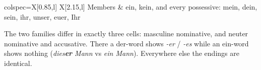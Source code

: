 
\begin{flattbl}{colspec={X[0.85,l] X[2.15,l]}}
  Members & ein, kein, and every possessive: mein, dein, sein, ihr, unser, euer, Ihr \\
\end{flattbl}

\begin{gnote}
The two families differ in exactly three cells: masculine nominative, and neuter
nominative and accusative. There a der-word shows \textit{-er} / \textit{-es}
while an ein-word shows nothing (\textit{dies\textbf{er} Mann} vs
\textit{ein Mann}). Everywhere else the endings are identical.
\end{gnote}
